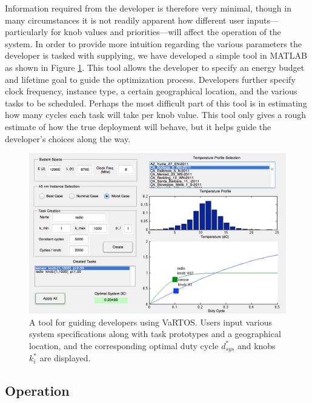 Information required from the developer is therefore very minimal, though in many circumstances it is not readily apparent how different user inputs---particularly for knob values and priorities---will affect the operation of the system.  In order to provide more intuition regarding the various parameters the developer is tasked with supplying, we have developed a simple tool in MATLAB as shown in Figure \ref{fig:gui}.  This tool allows the developer to specify an energy budget and lifetime goal to guide the optimization process.  Developers further specify clock frequency, instance type, a certain geographical location, and the various tasks to be scheduled.  Perhaps the most difficult part of this tool is in estimating how many cycles each task will take per knob value. This tool only gives a rough estimate of how the true deployment will behave, but it helps guide the developer's choices along the way.  

\begin{figure}
\centering
\includegraphics[width=1\textwidth]{figures/matlab_gui}
\caption{\label{fig:gui}A tool for guiding developers using VaRTOS. Users input various system specifications along with task prototypes and a geographical location, and the corresponding optimal duty cycle $d_{sys}^*$ and knobs $k_i^*$ are displayed. }
\end{figure}

\subsection{Operation}
\label{sec:vartos:operation}

